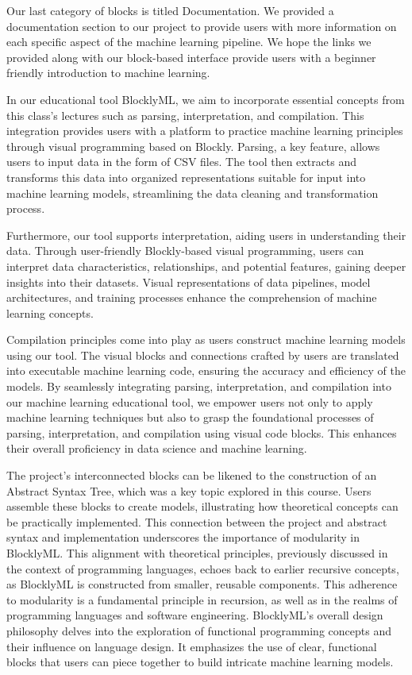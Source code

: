 \documentclass{article}
\theoremstyle{theorem}
\theoremstyle{definition}
\theoremstyle{remark}
\begin{document}
Our last category of blocks is titled Documentation. We provided a documentation section to our project to provide users with more information on each specific aspect of the machine learning pipeline. We hope the links we provided along with our block-based interface provide users with a beginner friendly introduction to machine learning.

In our educational tool BlocklyML, we aim to incorporate essential concepts from this class's lectures such as parsing, interpretation, and compilation. This integration provides users with a platform to practice machine learning principles through visual programming based on Blockly. Parsing, a key feature, allows users to input data in the form of CSV files. The tool then extracts and transforms this data into organized representations suitable for input into machine learning models, streamlining the data cleaning and transformation process.

Furthermore, our tool supports interpretation, aiding users in understanding their data. Through user-friendly Blockly-based visual programming, users can interpret data characteristics, relationships, and potential features, gaining deeper insights into their datasets. Visual representations of data pipelines, model architectures, and training processes enhance the comprehension of machine learning concepts.

Compilation principles come into play as users construct machine learning models using our tool. The visual blocks and connections crafted by users are translated into executable machine learning code, ensuring the accuracy and efficiency of the models. By seamlessly integrating parsing, interpretation, and compilation into our machine learning educational tool, we empower users not only to apply machine learning techniques but also to grasp the foundational processes of parsing, interpretation, and compilation using visual code blocks. This enhances their overall proficiency in data science and machine learning.

The project's interconnected blocks can be likened to the construction of an Abstract Syntax Tree, which was a key topic explored in this course. Users assemble these blocks to create models, illustrating how theoretical concepts can be practically implemented. This connection between the project and abstract syntax and implementation underscores the importance of modularity in BlocklyML. This alignment with theoretical principles, previously discussed in the context of programming languages, echoes back to earlier recursive concepts, as BlocklyML is constructed from smaller, reusable components. This adherence to modularity is a fundamental principle in recursion, as well as in the realms of programming languages and software engineering. BlocklyML's overall design philosophy delves into the exploration of functional programming concepts and their influence on language design. It emphasizes the use of clear, functional blocks that users can piece together to build intricate machine learning models.
\end{document}
